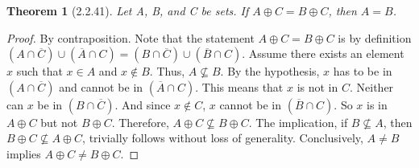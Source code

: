\documentclass[a4paper, 12pt]{article}
\theoremstyle{plain}
\newtheorem*{theorem*}{Theorem}
\begin{document}
	
\begin{theorem*}[2.2.41]
    Let A, B, and C be sets. If $A \oplus C = B \oplus C$, then $A = B$.
\end{theorem*}

\begin{proof} By contraposition. Note that the statement $A \oplus C = B \oplus C$ is by 
definition $(A \cap \overline{C}) \cup (\overline{A} \cap C) = 
(B \cap \overline{C}) \cup (\overline{B} \cap C)$. Assume there exists an element $x$ 
such that $x \in A$ and $x \notin B$. Thus, $A \not\subseteq B$. By the hypothesis, $x$ 
has to be in $(A \cap \overline{C})$ and cannot be in $(\overline{A} \cap C)$. This means 
that $x$ is not in $C$. Neither can $x$ be in $(B \cap \overline{C})$. And since 
$x \notin C$, $x$ cannot be in $(\overline{B} \cap C)$. So $x$ is in  $A \oplus C$ but not 
$B \oplus C$. Therefore, $A \oplus C \not\subseteq B \oplus C$. The implication, if 
$B \not\subseteq A$, then $B \oplus C \not\subseteq A \oplus C$, trivially follows without 
loss of generality. Conclusively, $A \neq B$ implies $A \oplus C \neq B \oplus C$.
\end{proof}
\end{document}
